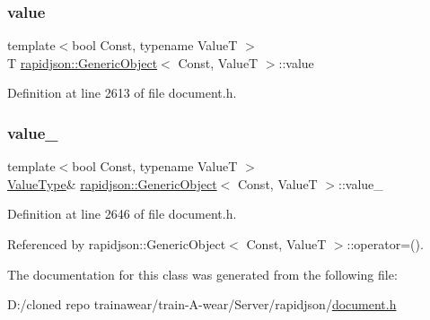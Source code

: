 \subsubsection{\texorpdfstring{value}{value}}
{\footnotesize\ttfamily template$<$bool Const, typename ValueT $>$ \\
T \mbox{\hyperlink{classrapidjson_1_1_generic_object}{rapidjson\+::\+Generic\+Object}}$<$ Const, ValueT $>$\+::value}



Definition at line 2613 of file document.\+h.

\mbox{\label{classrapidjson_1_1_generic_object_a6e9b11ee1609f0e54119c974dbdc10af}} 
\subsubsection{\texorpdfstring{value\_}{value\_}}
{\footnotesize\ttfamily template$<$bool Const, typename ValueT $>$ \\
\mbox{\hyperlink{classrapidjson_1_1_generic_object_a282660500748eff5ebab93b88a9d478f}{Value\+Type}}\& \mbox{\hyperlink{classrapidjson_1_1_generic_object}{rapidjson\+::\+Generic\+Object}}$<$ Const, ValueT $>$\+::value\+\_\+\hspace{0.3cm}{\ttfamily [private]}}



Definition at line 2646 of file document.\+h.



Referenced by rapidjson\+::\+Generic\+Object$<$ Const, Value\+T $>$\+::operator=().



The documentation for this class was generated from the following file\+:\begin{DoxyCompactItemize}
\item 
D\+:/cloned repo trainawear/train-\/\+A-\/wear/\+Server/rapidjson/\mbox{\hyperlink{document_8h}{document.\+h}}\end{DoxyCompactItemize}
